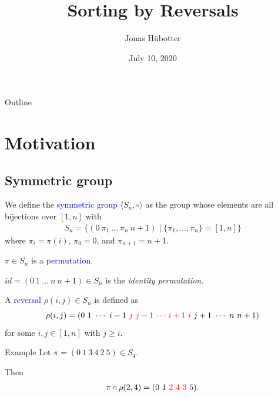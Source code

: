 \documentclass[handout]{beamer}
\title[Sorting by Reversals]{Sorting by Reversals}
\author{Jonas Hübotter}
\date{July 10, 2020}
\theoremstyle{definition}
\def\spadding{\vspace{0.25cm}}
\def\b{\textcolor{blue}}
\def\r{\textcolor{red}}
\begin{document}
\begin{frame}
  \titlepage
\end{frame}

\begin{frame}{Outline}
 \tableofcontents
\end{frame}

\section{Motivation}

\subsection{Symmetric group}

\begin{frame}

\begin{definition}
We define the \b{symmetric group} $\langle S_n, \circ \rangle$ as the group whose elements are all bijections over $[1,n]$ \pause with
\begin{align*}
    S_n = \{(0\ \pi_1\ \dots\ \pi_n\ n+1) \mid \{\pi_1, \dots, \pi_n\} = [1,n]\}
\end{align*}
where $\pi_i = \pi(i)$, $\pi_0 = 0$, and $\pi_{n+1} = n+1$.\pause\spadding

$\pi \in S_n$ is a \b{permutation}.\pause\spadding

$id = (0\ 1\ \dots\ n\ n+1) \in S_n$ is the \textit{identity permutation}.
\end{definition}

\end{frame}

\begin{frame}

\begin{definition}
A \b{reversal} $\rho(i,j) \in S_n$ is defined as
\[
    \rho(i,j) = (0\ 1\ \cdots\ i-1\ \r j\ \r{j-1}\ \r \cdots\ \r{i+1}\ \r i\ j+1\ \cdots\ n\ n+1)
\]
for some $i, j \in [1, n]$ with $j \geq i$.
\end{definition}\pause

\begin{exampleblock}{Example}
Let $\pi = (0\ 1\ 3\ 4\ 2\ 5) \in S_4$. \par
Then
\begin{align*}
    \pi \circ \rho(2,4) = (0\ 1\ \r{2\ 4\ 3}\ 5).
\end{align*}
\end{exampleblock}

\end{frame}
\end{document}
